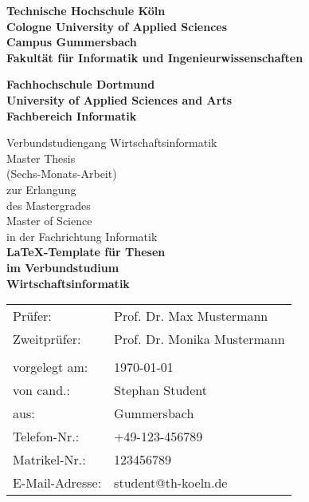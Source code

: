 \documentclass[12pt,oneside,a4paper,bibtotoc,liststotoc]{scrreprt}
\begin{document}
\begin{titlepage}
\begin{center}
\textbf{\Large Technische Hochschule Köln\\
Cologne University of Applied Sciences\\[0.1cm]
\normalsize Campus Gummersbach\\
Fakultät für Informatik und Ingenieurwissenschaften\\[0.5cm]}

\textbf{\Large Fachhochschule Dortmund\\
University of Applied Sciences and Arts\\[0.1cm]
\normalsize Fachbereich Informatik\\[0.5cm]}
 
\Large Verbundstudiengang Wirtschaftsinformatik\\[0.5cm]

\large Master Thesis\\[0.1cm]
(Sechs-Monats-Arbeit) \\[0.1cm] zur Erlangung \\[0.1cm] des Mastergrades \\[0.1cm] \glqq Master of Science\grqq \\[0.1cm] in der Fachrichtung Informatik \\[1.5cm]
  
{ \huge \bfseries \LaTeX-Template für Thesen\\[0.1cm]
        im Verbundstudium\\[0.5cm]
        Wirtschaftsinformatik}\\

\vfill

\begin{table}[h]
\centering
\begin{tabular}{ll}
  Prüfer:         & Prof. Dr. Max Mustermann \\
  Zweitprüfer:    & Prof. Dr. Monika Mustermann \\
                  &  \\
  vorgelegt am:   & \today \\
  von cand.:      & Stephan Student \\
  aus:            & Gummersbach \\
  Telefon-Nr.:    & +49-123-456789 \\
  Matrikel-Nr.:   & 123456789 \\
  E-Mail-Adresse: & student@th-koeln.de
\end{tabular}
\end{table}
\end{center}
\end{titlepage}
\end{document}
